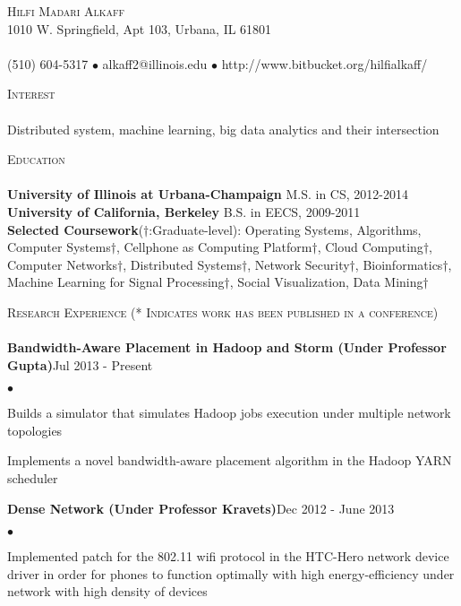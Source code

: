 \documentclass{article}
\newcommand{\lineunder}{\vspace*{-8pt} \\ \hspace*{-18pt} \hrulefill \\}
\newcommand{\header}[1]{{\hspace*{-15pt}\vspace*{6pt} \textsc{#1}} \vspace*{-6pt} \lineunder}
\newcommand{\project}[2]{{ \textbf{#1}\hfill{#2}\\ }}
\newcommand{\contact}[3]{
\vspace*{-8pt}
\begin{center}
{\LARGE \scshape {#1}}\\
#2 \lineunder
#3
\end{center}
\vspace*{-8pt}
}
\newenvironment{achievements}{\begin{list}{$\bullet$}{\topsep 0pt \itemsep -2pt}}{\vspace*{4pt}\end{list}}
\newcommand{\school}[2]{
 \textbf{#1} \hfill{#2} \\
}
\begin{document}
\small
\smallskip
\vspace*{-44pt}

\contact{Hilfi Madari Alkaff}
{1010 W. Springfield, Apt 103, Urbana, IL 61801}
{(510) 604-5317 $\bullet$ alkaff2@illinois.edu  $\bullet$ http://www.bitbucket.org/hilfialkaff/}

\header{Interest}
Distributed system, machine learning, big data analytics and their intersection
\vspace*{5pt}

\header{Education}

\school{University of Illinois at Urbana-Champaign}{M.S. in CS, 2012-2014}
\school{University of California, Berkeley}{B.S. in EECS, 2009-2011}

\vspace*{5pt}
\textbf{Selected Coursework}($\dagger$:Graduate-level): Operating Systems, Algorithms, Computer Systems$\dagger$, Cellphone as Computing Platform$\dagger$, Cloud Computing$\dagger$, Computer Networks$\dagger$, Distributed Systems$\dagger$, Network Security$\dagger$, Bioinformatics$\dagger$, Machine Learning for Signal Processing$\dagger$, Social Visualization, Data Mining$\dagger$
\vspace*{5pt}

\header{Research Experience (* Indicates work has been published in a conference)}

\project{Bandwidth-Aware Placement in Hadoop and Storm (Under Professor Gupta)}{Jul 2013 - Present}
    \begin{achievements}
        \item Builds a simulator that simulates Hadoop jobs execution under multiple network topologies
        \item Implements a novel bandwidth-aware placement algorithm in the Hadoop YARN scheduler
    \end{achievements}

\project{Dense Network (Under Professor Kravets)}{Dec 2012 - June 2013}
    \begin{achievements}
    \item Implemented patch for the 802.11 wifi protocol in the HTC-Hero network device driver in order for phones to function optimally with high energy-efficiency under network with high density of devices
		\end{achievements}
\end{document}

